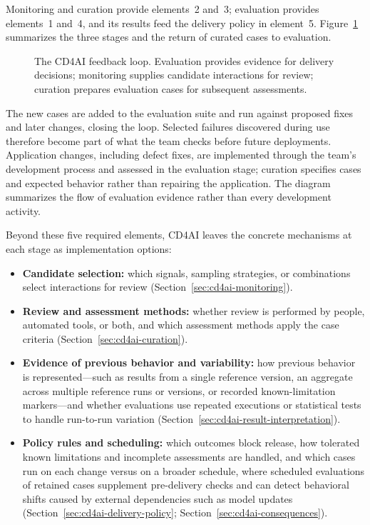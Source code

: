 Monitoring and curation provide elements~2 and~3; evaluation provides
elements~1 and~4, and its results feed the delivery policy in element~5.
Figure~\ref{fig:cd4ai-feedback-loop} summarizes the three stages and the return
of curated cases to evaluation.

\begin{figure}[htbp]
  \centering
  
  \caption{The CD4AI feedback loop. Evaluation provides evidence for delivery
    decisions; monitoring supplies candidate interactions for review;
    curation prepares evaluation cases for subsequent assessments.}
  \label{fig:cd4ai-feedback-loop}
\end{figure}

The new cases are added to the evaluation suite and run against proposed fixes
and later changes, closing the loop. Selected failures discovered during use
therefore become part of what the team checks before future deployments.
Application changes, including defect fixes, are implemented through the team's
development process and assessed in the evaluation stage; curation specifies
cases and expected behavior rather than repairing the application. The diagram
summarizes the flow of evaluation evidence rather than every development
activity.

Beyond these five required elements, CD4AI leaves the concrete mechanisms at
each stage as implementation options:
\begin{itemize}
  \item \textbf{Candidate selection:} which signals, sampling strategies, or
    combinations select interactions for review
    (Section~\ref{sec:cd4ai-monitoring}).
  \item \textbf{Review and assessment methods:} whether review is performed by
    people, automated tools, or both, and which assessment methods apply the
    case criteria (Section~\ref{sec:cd4ai-curation}).
  \item \textbf{Evidence of previous behavior and variability:} how previous
    behavior is represented---such as results from a single reference version,
    an aggregate across multiple reference runs or versions, or recorded
    known-limitation markers---and whether evaluations use repeated executions
    or statistical tests to handle run-to-run variation
    (Section~\ref{sec:cd4ai-result-interpretation}).
  \item \textbf{Policy rules and scheduling:} which outcomes block release, how
    tolerated known limitations and incomplete assessments are handled, and
    which cases run on each change versus on a broader schedule, where
    scheduled evaluations of retained cases supplement pre-delivery checks and
    can detect behavioral shifts caused by external dependencies such as model
    updates (Section~\ref{sec:cd4ai-delivery-policy};
    Section~\ref{sec:cd4ai-consequences}).
\end{itemize}

